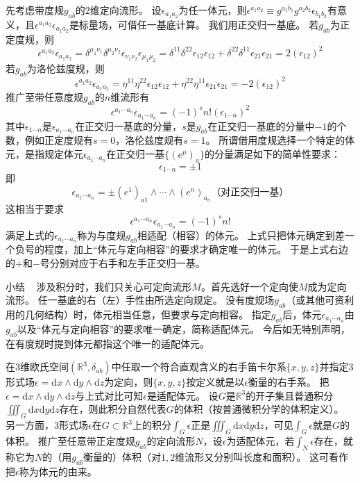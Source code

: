 先考虑带度规$g_{ab}$的$2$维定向流形。
设$\epsilon_{a_1a_2}$为任一体元，则$\epsilon^{a_1a_2} \equiv g^{a_1b_1}g^{a_2b_2}\epsilon_{b_1b_2}$有意义，且$\epsilon^{a_1a_2}\epsilon_{a_1a_2}$是标量场，可借任一基底计算。
我们用正交归一基底。
若$g_{ab}$为正定度规，则
$$\epsilon^{a_1a_2}\epsilon_{a_1a_2} = \delta^{\mu_1\nu_1}\delta^{\mu_2\nu_2}\epsilon_{\nu_1\nu_2}\epsilon_{\mu_1\mu_2} = \delta^{11}\delta^{22}\epsilon_{12}\epsilon_{12} + \delta^{22}\delta^{11}\epsilon_{21}\epsilon_{21} = 2(\epsilon_{12})^2$$
若$g_{ab}$为洛伦兹度规，则
$$\epsilon^{a_1a_2}\epsilon_{a_1a_2} = \eta^{11}\eta^{22}\epsilon_{12}\epsilon_{12} + \eta^{22}\eta^{11}\epsilon_{21}\epsilon_{21} = -2(\epsilon_{12})^2$$
推广至带任意度规$g_{ab}$的$n$维流形有
$$\epsilon^{a_1 \cdots a_n}\epsilon_{a_1 \cdots a_n} = (-1)^sn!(\epsilon_{1 \cdots n})^2$$
其中$\epsilon_{1 \cdots n}$是$\epsilon_{a_1 \cdots a_n}$在正交归一基底的分量，$s$是$g_{ab}$在正交归一基底的分量中$-1$的个数，例如正定度规有$s = 0$，洛伦兹度规有$s = 1$。
所谓借用度规选择一个特定的体元，是指规定体元$\epsilon_{a_1 \cdots a_n}$在正交归一基$\{(e^\mu)_a\}$的分量满足如下的简单性要求：
$$\epsilon_{1 \cdots n} = \pm 1$$
即
$$\epsilon_{a_1 \cdots a_n} = \pm(e^1)_{a1} \wedge \cdots \wedge(e^n)_{a_n} \text{（对正交归一基）}$$
这相当于要求
$$\epsilon^{a_1 \cdots a_n}\epsilon_{a_1 \cdots a_n} = (-1)^sn!$$
满足上式的$\epsilon_{a_1 \cdots a_n}$称为与度规$g_{ab}$相适配（相容）的体元。
上式只把体元确定到差一个负号的程度，加上``体元与定向相容''的要求才确定唯一的体元。
于是上式右边的$+$和$-$号分别对应于右手和左手正交归一基。

小结 ~ 涉及积分时，我们只关心可定向流形$M$。首先选好一个定向使$M$成为定向流形。
任一基底的右（左）手性由所选定向规定。
没有度规场$g_{ab}$（或其他可资利用的几何结构）时，体元相当任意，但要求与定向相容。
指定$g_{ab}$后，体元$\epsilon_{a_1 \cdots a_n}$由$g_{ab}$以及``体元与定向相容''的要求唯一确定，简称适配体元。
今后如无特别声明，在有度规时提到体元都指这个唯一的适配体元。

在$3$维欧氏空间$(\mathbb{R}^3, \delta_{ab})$中任取一个符合直观含义的右手笛卡尔系$\{x, y, z\}$并指定$3$形式场$\epsilon = \mathrm{d}x \wedge \mathrm{d}y \wedge \mathrm{d}z$为定向，则$\{x, y, z\}$按定义就是以$\epsilon$衡量的右手系。
把$\epsilon = \mathrm{d}x \wedge \mathrm{d}y \wedge \mathrm{d}z$与上式对比可知$\epsilon$是适配体元。
设$G$是$\mathbb{R}^3$的开子集且普通积分$\displaystyle\iiint_G\mathrm{d}x\mathrm{d}y\mathrm{d}z$存在，则此积分自然代表$G$的体积（按普通微积分学的体积定义）。
另一方面，$3$形式场$\epsilon$在$G \subset \mathbb{R}^3$上的积分$\displaystyle\int_G\epsilon$正是$\displaystyle\iiint_G\mathrm{d}x\mathrm{d}y\mathrm{d}z$，可见$\displaystyle\int_G\epsilon$就是$G$的体积。
推广至任意带正定度规$g_{ab}$的定向流形$N$，设$\epsilon$为适配体元，若$\displaystyle\int_N\epsilon$存在，就称它为$N$的（用$g_{ab}$衡量的）体积（对$1, 2$维流形又分别叫长度和面积）。
这可看作把$\epsilon$称为体元的由来。

